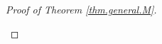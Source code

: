 \documentclass[11pt]{article} %
\begin{document}
\begin{proof}[Proof of Theorem \ref{thm.general.M}]
\begin{itemize}
\begin{lemma}
		\end{lemma}
	\end{itemize}
\end{proof}
\end{document}
